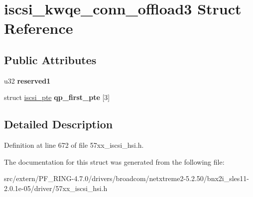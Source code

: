 \hypertarget{structiscsi__kwqe__conn__offload3}{
\section{iscsi\_\-kwqe\_\-conn\_\-offload3 Struct Reference}
\label{structiscsi__kwqe__conn__offload3}
}
\subsection*{Public Attributes}
\begin{DoxyCompactItemize}
\item 
\hypertarget{structiscsi__kwqe__conn__offload3_a5615c1fee4b08d0df4281a5d99a21060}{
u32 {\bfseries reserved1}}
\label{structiscsi__kwqe__conn__offload3_a5615c1fee4b08d0df4281a5d99a21060}

\item 
\hypertarget{structiscsi__kwqe__conn__offload3_a16a9a0804302f96339dcf53a0b9a10df}{
struct \hyperlink{structiscsi__pte}{iscsi\_\-pte} {\bfseries qp\_\-first\_\-pte} \mbox{[}3\mbox{]}}
\label{structiscsi__kwqe__conn__offload3_a16a9a0804302f96339dcf53a0b9a10df}

\end{DoxyCompactItemize}


\subsection{Detailed Description}


Definition at line 672 of file 57xx\_\-iscsi\_\-hsi.h.



The documentation for this struct was generated from the following file:\begin{DoxyCompactItemize}
\item 
src/extern/PF\_\-RING-\/4.7.0/drivers/broadcom/netxtreme2-\/5.2.50/bnx2i\_\-sles11-\/2.0.1e-\/05/driver/57xx\_\-iscsi\_\-hsi.h\end{DoxyCompactItemize}
